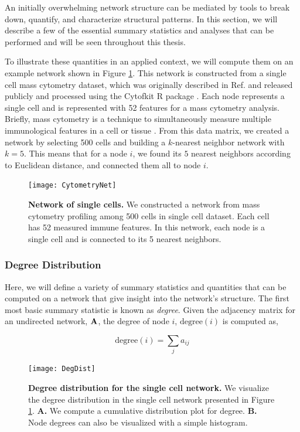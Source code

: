 \indent An initially overwhelming network structure can be mediated by tools to break down, quantify, and characterize structural patterns. In this section, we will describe a few of the essential summary statistics and analyses that can be performed and will be seen throughout this thesis.

\indent To illustrate these quantities in an applied context, we will compute them on an example network shown in Figure \ref{fig:Cytometry}. This network is constructed from a single cell mass cytometry dataset, which was originally described in Ref. \cite{wong2015} and released publicly and processed using the Cytofkit R package \cite{cytofkit}. Each node represents a single cell and is represented with 52 features for a mass cytometry analysis. Briefly, mass cytometry is a technique to simultaneously measure multiple immunological features in a cell or tissue \cite{cytof}. From this data matrix, we created a network by selecting 500 cells and building a $k$-nearest neighbor network with $k=5$. This means that for a node $i$, we found its $5$ nearest neighbors according to Euclidean distance, and connected them all to node $i$. 

\begin{figure}
\begin{center}
\texttt{[image: CytometryNet]}
\caption{{\bf Network of single cells.} We constructed a network from mass cytometry profiling among 500 cells in single cell dataset. Each cell has 52 measured immune features. In this network, each node is a single cell and is connected to its 5 nearest neighbors.}
\label{fig:Cytometry}
\end{center}
\end{figure}

\subsubsection{Degree Distribution}

Here, we will define a variety of summary statistics and quantities that can be computed on a network that give insight into the network's structure. The first most basic summary statistic is known as \emph{degree}.  Given the adjacency matrix for an undirected network, ${\bf A}$, the degree of node $i$, $\text{degree}(i)$ is computed as,

\begin{equation}
\text{degree}(i)=\sum_{j}a_{ij}
\end{equation}

\begin{figure}
\begin{center}
\texttt{[image: DegDist]}
\caption{{\bf Degree distribution for the single cell network.} We visualize the degree distribution in the single cell network presented in Figure \ref{fig:Cytometry}. {\bf A.} We compute a cumulative distribution plot for degree. {\bf B.} Node degrees can also be visualized with a simple histogram.}
\label{fig:DegDist}
\end{center}
\end{figure}

